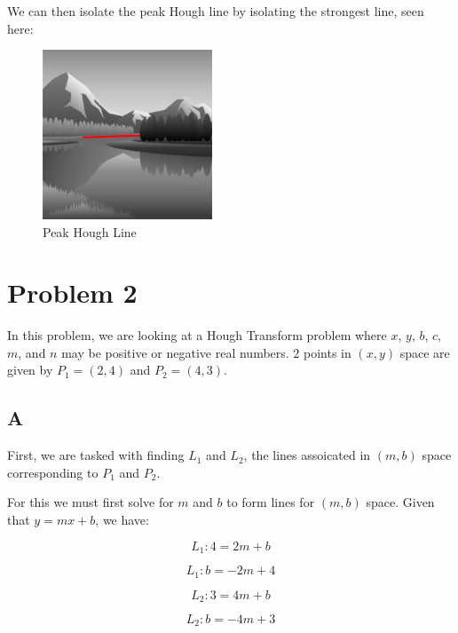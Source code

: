 \documentclass{article}
\begin{document}
We can then isolate the peak Hough line by isolating the strongest line, seen here:

\begin{figure}[H]
    \centering
    \includegraphics[width = 0.45\textwidth]{imgs/hough_lines_peak_line.jpg}
    \caption{Peak Hough Line}
    \label{fig:1-6}
\end{figure}


\section*{Problem 2}

In this problem, we are looking at a Hough Transform problem where $x$, $y$, $b$, $c$, $m$, and $n$ may be positive or negative real numbers. $2$ points in $(x,y)$ space are given by $P_1=(2,4)$ and $P_2=(4,3)$.

\subsection*{A}

First, we are tasked with finding $L_1$ and $L_2$, the lines assoicated in $(m,b)$ space corresponding to $P_1$ and $P_2$.

For this we must first solve for $m$ and $b$ to form lines for $(m,b)$ space. Given that $y = mx + b$, we have:

\begin{equation}
    L_1: 4 = 2m + b
\end{equation}

\begin{equation}
    L_1: b = -2m + 4
\end{equation}

\begin{equation}
    L_2: 3 = 4m + b
\end{equation}

\begin{equation}
    L_2: b = -4m + 3
\end{equation}
\end{document}
